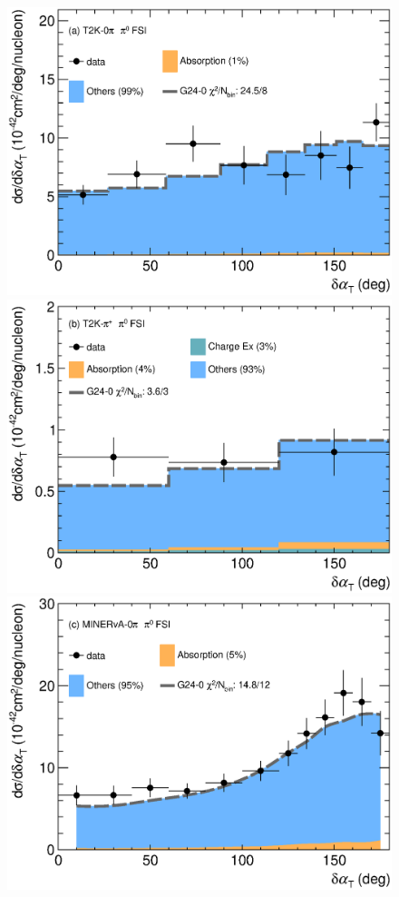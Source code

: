 \begin{figure}[!htb] 
\centering 		
    \includegraphics[width=\dbfigwid\textwidth]{figures/tuning/0000-t2k_0pi_dalphat_pi0_decomp.eps} 
    \includegraphics[width=\dbfigwid\textwidth]{figures/tuning/0000-t2k_pip_dalphat_pi0_decomp.eps} 
    \includegraphics[width=\dbfigwid\textwidth]{figures/tuning/0000-min_0pi_dalphat_pi0_decomp.eps} 

\end{figure}
